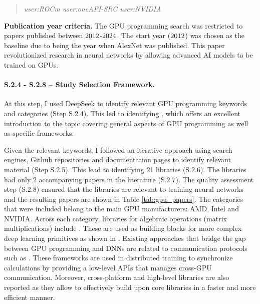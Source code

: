 \begin{quote}
	\textit{user:ROCm user:oneAPI-SRC user:NVIDIA}
\end{quote}

\textbf{Publication year criteria.}
The GPU programming search was restricted to papers published between
$2012$-$2024$. The start year ($2012$) was chosen as the baseline due
to being the year when AlexNet \cite{krizhevsky_imagenet_2012} was published. This paper
revolutionized research in neural networks by allowing advanced AI models to be trained on GPUs.

\paragraph{S.2.4 - S.2.8 -- Study Selection Framework.}
\label{sec:ai-screening}
At this step, I used DeepSeek \cite{noauthor_deepseek_nodate} to identify relevant GPU programming
keywords and categories (Step S.2.4). This led to identifying \cite{noauthor_enccsgpu-programming_nodate}, which
offers an excellent introduction to the topic covering general aspects of GPU programming as well
as specific frameworks.


Given the relevant keywords, I followed an iterative approach using search engines, Github
repositories and documentation pages to identify relevant material (Step S.2.5). This lead to
identifying 21 libraries (S.2.6). The libraries had only 2 accompanying papers
\cite{chetlur_cudnn_2014,okuta_cupy_2017} in the literature (S.2.7). The quality assessment step
(S.2.8) ensured that the libraries are relevant to training neural networks and the resulting
papers are shown in Table \ref{tab:gpu_papers}. The categories that were included belong to the
main GPU manufacturers: AMD, Intel and NVIDIA. Across each category, libraries for algebraic
operations (matrix multiplications) include \cite{noauthor_cublas_nodate,noauthor_rocmrocblas_2025,
	noauthor_uxlfoundationonemath_2025}. These are used as building blocks for more complex deep
learning primitives as shown in
\cite{chetlur_cudnn_2014,noauthor_rocmmiopen_2025,onednn_contributors_oneapi_2025}. Existing
approaches that bridge the gap between GPU programming and DNNs are related to communication
protocols such as
\cite{noauthor_nvidianccl_2025,noauthor_rocmrccl_2025,noauthor_uxlfoundationoneccl_2025}. These
frameworks are used in distributed training to synchronize calculations by providing a low-level
APIs that manages cross-GPU communication. Moreover, cross-platform and high-level libraries are
also reported as they allow to effectively build upon core libraries in a faster and more efficient
manner.

